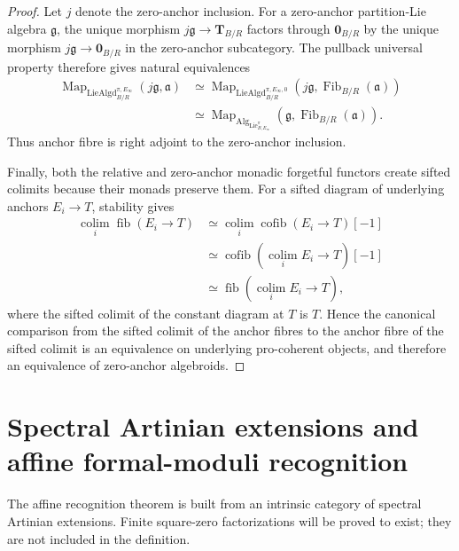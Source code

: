 \begin{proof}
Let $j$ denote the zero-anchor inclusion.  For a zero-anchor partition-Lie
algebra $\mathfrak g$, the unique morphism
$j\mathfrak g\to\mathbf T_{B/R}$ factors through
$\mathbf 0_{B/R}$ by the unique morphism $j\mathfrak g\to\mathbf 0_{B/R}$ in
the zero-anchor subcategory.  The pullback universal property therefore gives
natural equivalences
\[
\begin{aligned}
\operatorname{Map}_{\operatorname{LieAlgd}^{\pi,E_\infty}_{B/R}}
\left(j\mathfrak g,\mathfrak a\right)
&\simeq
\operatorname{Map}_{\operatorname{LieAlgd}^{\pi,E_\infty,0}_{B/R}}
\left(
    j\mathfrak g,
    \operatorname{Fib}_{B/R}(\mathfrak a)
\right)\\
&\simeq
\operatorname{Map}_{\operatorname{Alg}_{\operatorname{Lie}^{\pi}_{B,E_\infty}}}
\left(
    \mathfrak g,
    \operatorname{Fib}_{B/R}(\mathfrak a)
\right).
\end{aligned}
\]
Thus anchor fibre is right adjoint to the zero-anchor inclusion.

Finally, both the relative and zero-anchor monadic forgetful functors create
sifted colimits because their monads preserve them.  For a sifted diagram of
underlying anchors $E_i\to T$, stability gives
\[
\begin{aligned}
\operatorname*{colim}_i\operatorname{fib}(E_i\to T)
&\simeq
\operatorname*{colim}_i\operatorname{cofib}(E_i\to T)[-1]\\
&\simeq
\operatorname{cofib}
\left(
    \operatorname*{colim}_iE_i\longrightarrow T
\right)[-1]\\
&\simeq
\operatorname{fib}
\left(
    \operatorname*{colim}_iE_i\longrightarrow T
\right),
\end{aligned}
\]
where the sifted colimit of the constant diagram at $T$ is $T$.  Hence the
canonical comparison from the sifted colimit of the anchor fibres to the
anchor fibre of the sifted colimit is an equivalence on underlying
pro-coherent objects, and therefore an equivalence of zero-anchor algebroids.
\end{proof}

\section{Spectral Artinian extensions and affine formal-moduli recognition}
\label{sec:bnla-spectral-formal-recognition}

The affine recognition theorem is built from an intrinsic category of
spectral Artinian extensions.  Finite square-zero factorizations will be
proved to exist; they are not included in the definition.

